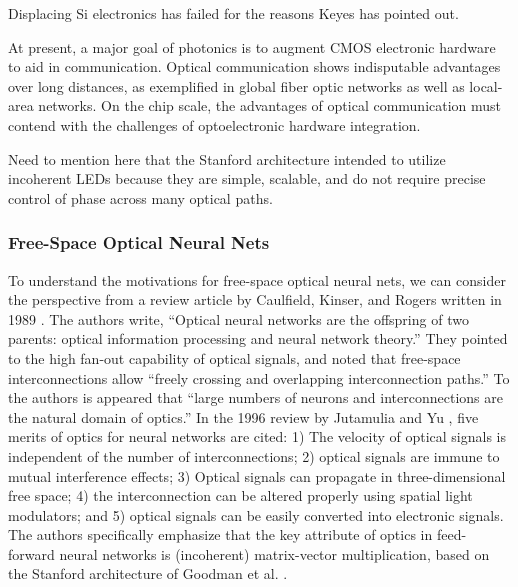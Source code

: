 Displacing Si electronics has failed for the reasons Keyes has pointed out.

At present, a major goal of photonics is to augment CMOS electronic hardware to aid in communication. Optical communication shows indisputable advantages over long distances, as exemplified in global fiber optic networks as well as local-area networks. On the chip scale, the advantages of optical communication must contend with the challenges of optoelectronic hardware integration. 


\vspace{3em}
Need to mention here that the Stanford architecture intended to utilize incoherent LEDs because they are simple, scalable, and do not require precise control of phase across many optical paths.


\subsubsection{Free-Space Optical Neural Nets}
To understand the motivations for free-space optical neural nets, we can consider the perspective from a review article by Caulfield, Kinser, and Rogers written in 1989 \cite{caki1989}. The authors write, ``Optical neural networks are the offspring of two parents: optical information processing and neural network theory.'' They pointed to the high fan-out capability of optical signals, and noted that free-space interconnections allow ``freely crossing and overlapping interconnection paths.'' To the authors is appeared that ``large numbers of neurons and interconnections are the natural domain of optics.'' In the 1996 review by Jutamulia and Yu \cite{juya1996}, five merits of optics for neural networks are cited: 1) The velocity of optical signals is independent of the number of interconnections; 2) optical signals are immune to mutual interference effects; 3) Optical signals can propagate in three-dimensional free space; 4) the interconnection can be altered properly using spatial light modulators; and 5) optical signals can be easily converted into electronic signals. The authors specifically emphasize that the key attribute of optics in feed-forward neural networks is (incoherent) matrix-vector multiplication, based on the Stanford architecture of Goodman et al. \cite{godi1978}. 

